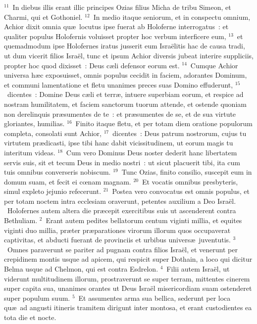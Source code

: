 ${}^{11}$~In diebus illis erant illic principes Ozias filius Micha de tribu Simeon, et Charmi, qui et Gothoniel.
${}^{12}$~In medio itaque seniorum, et in conspectu omnium, Achior dixit omnia qu\ae\ locutus ipse fuerat ab Holoferne interrogatus~: et qualiter populus Holofernis voluisset propter hoc verbum interficere eum,
${}^{13}$~et quemadmodum ipse Holofernes iratus jusserit eum Isra\"elitis hac de causa tradi, ut dum vicerit filios Isra\"el, tunc et ipsum Achior diversis jubeat interire suppliciis, propter hoc quod dixisset~: Deus c\ae li defensor eorum est.
${}^{14}$~Cumque Achior universa h\ae c exposuisset, omnis populus cecidit in faciem, adorantes Dominum, et communi lamentatione et fletu unanimes preces suas Domino effuderunt,
${}^{15}$~dicentes~: Domine Deus c\ae li et terr\ae , intuere superbiam eorum, et respice ad nostram humilitatem, et faciem sanctorum tuorum attende, et ostende quoniam non derelinquis pr\ae sumentes de te~: et pr\ae sumentes de se, et de sua virtute gloriantes, humilias.
${}^{16}$~Finito itaque fletu, et per totam diem oratione populorum completa, consolati sunt Achior,
${}^{17}$~dicentes~: Deus patrum nostrorum, cujus tu virtutem pr\ae dicasti, ipse tibi hanc dabit vicissitudinem, ut eorum magis tu interitum videas.
${}^{18}$~Cum vero Dominus Deus noster dederit hanc libertatem servis suis, sit et tecum Deus in medio nostri~: ut sicut placuerit tibi, ita cum tuis omnibus converseris nobiscum.
${}^{19}$~Tunc Ozias, finito consilio, suscepit eum in domum suam, et fecit ei cœnam magnam.
${}^{20}$~Et vocatis omnibus presbyteris, simul expleto jejunio refecerunt.
${}^{21}$~Postea vero convocatus est omnis populus, et per totam noctem intra ecclesiam oraverunt, petentes auxilium a Deo Isra\"el.
~Holofernes autem altera die pr\ae cepit exercitibus suis ut ascenderent contra Bethuliam.
${}^{2}$~Erant autem pedites bellatorum centum viginti millia, et equites viginti duo millia, pr\ae ter pr\ae parationes virorum illorum quos occupaverat captivitas, et abducti fuerant de provinciis et urbibus univers\ae\ juventutis.
${}^{3}$~Omnes paraverunt se pariter ad pugnam contra filios Isra\"el, et venerunt per crepidinem montis usque ad apicem, qui respicit super Dothain, a loco qui dicitur Belma usque ad Chelmon, qui est contra Esdrelon.
${}^{4}$~Filii autem Isra\"el, ut viderunt multitudinem illorum, prostraverunt se super terram, mittentes cinerem super capita sua, unanimes orantes ut Deus Isra\"el misericordiam suam ostenderet super populum suum.
${}^{5}$~Et assumentes arma sua bellica, sederunt per loca qu\ae\ ad angusti itineris tramitem dirigunt inter montosa, et erant custodientes ea tota die et nocte.


